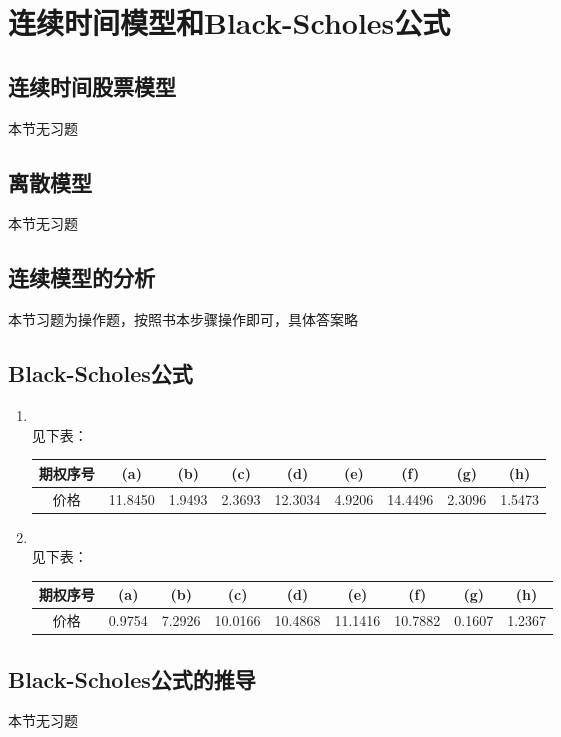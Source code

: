 \section{连续时间模型和Black-Scholes公式}
\subsection{连续时间股票模型}
本节无习题
\subsection{离散模型}
本节无习题
\subsection{连续模型的分析}
本节习题为操作题，按照书本步骤操作即可，具体答案略
\subsection{Black-Scholes公式}
\begin{enumerate}
    \item \sol\\
    见下表：
    \begin{table}[H]
        \centering
        \begin{tabular}{|c|c|c|c|c|c|c|c|c|}
            \hline
            期权序号 & (a) & (b) & (c) & (d) & (e) & (f) & (g) & (h) \\ \hline
            价格 & 11.8450  &  1.9493  &  2.3693  &  12.3034  &  4.9206  & 14.4496  &  2.3096  &  1.5473 \\ \hline
        \end{tabular}
    \end{table}
    \item \sol\\
    见下表：
    \begin{table}[H]
        \centering
        \begin{tabular}{|c|c|c|c|c|c|c|c|c|}
            \hline
            期权序号 & (a) & (b) & (c) & (d) & (e) & (f) & (g) & (h) \\ \hline
            价格 & 0.9754  &  7.2926  &  10.0166  &  10.4868  &  11.1416  &  10.7882  &  0.1607  &  1.2367 \\ \hline
        \end{tabular}
    \end{table}
\end{enumerate}
\subsection{Black-Scholes公式的推导}
本节无习题
